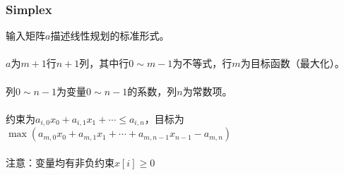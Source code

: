 \documentclass[twoside]{article}
\begin{document}
\subsubsection{Simplex}

输入矩阵$a$描述线性规划的标准形式。\\\\
$a$为$m+1$行$n+1$列，其中行$0 \sim m-1$为不等式，行$m$为目标函数（最大化）。\\\\
列$0 \sim n-1$为变量$0 \sim n-1$的系数，列$n$为常数项。\\\\
约束为$a_{i, 0}x_0 + a_{i, 1}x_1 + \cdots \le a_{i, n}$，目标为$\max(a_{m, 0}x_0 + a_{m, 1}x_1 + \cdots + a_{m, n - 1}x_{n - 1} - a_{m, n})$\\\\
注意：变量均有非负约束$x[i] \ge 0$
\end{document}
